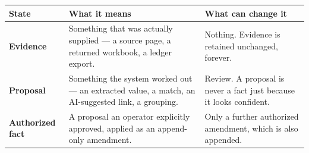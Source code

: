 \documentclass[
]{article}
\newcounter{none} %
\begin{document}
{\def\LTcaptype{none} %
\begin{longtable}[]{@{}
  >{\raggedright\arraybackslash}p{}
  >{\raggedright\arraybackslash}p{}
  >{\raggedright\arraybackslash}p{}@{}}
\toprule\noalign{}
\begin{minipage}[b]{\linewidth}\raggedright
State
\end{minipage} & \begin{minipage}[b]{\linewidth}\raggedright
What it means
\end{minipage} & \begin{minipage}[b]{\linewidth}\raggedright
What can change it
\end{minipage} \\
\midrule\noalign{}
\endhead
\bottomrule\noalign{}
\endlastfoot
\textbf{Evidence} & Something that was actually supplied --- a source
page, a returned workbook, a ledger export. & Nothing. Evidence is
retained unchanged, forever. \\
\textbf{Proposal} & Something the system worked out --- an extracted
value, a match, an AI-suggested link, a grouping. & Review. A proposal
is never a fact just because it looks confident. \\
\textbf{Authorized fact} & A proposal an operator explicitly approved,
applied as an append-only amendment. & Only a further authorized
amendment, which is also appended. \\
\end{longtable}
}
\end{document}
